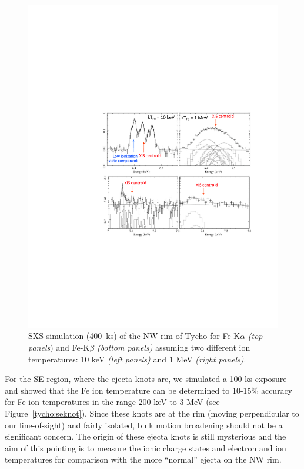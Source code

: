 \documentclass[11pt,a4paper]{article}
\begin{document}
{\begin{figure}
  \begin{center}
    \includegraphics[width=5.0in,clip,trim=180 220 60 260]{tycho400ks-Fesim_clean}
  \caption{SXS simulation (400~ks) of the NW rim of Tycho for Fe-K$\alpha$
    {\it (top panels}) and Fe-K$\beta$ {\it (bottom panels)} 
    assuming two different ion temperatures: 10 keV  {\it (left panels)} 
    and  1 MeV  {\it (right panels)}. }
  \label{tycho:nwsims}
  \end{center}
\end{figure}


For the SE region, where the ejecta knots are, we simulated a 100 ks
exposure and showed that the Fe ion temperature can be determined to
10-15\% accuracy for Fe ion temperatures in the range 200 keV to 3 MeV
(see Figure~\ref{tycho:seknot}).  Since these knots are at the rim
(moving perpendicular to our line-of-sight) and fairly isolated, bulk
motion broadening should not be a significant concern. The origin of
these ejecta knots is still mysterious and the aim of this pointing is
to measure the ionic charge states and electron and ion temperatures
for comparison with the more ``normal'' ejecta on the NW rim. 

}
\end{document}
